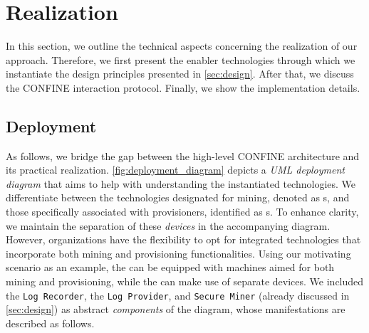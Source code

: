 \section{Realization}
\label{sec:realization}
In this section, we outline the technical aspects concerning the realization of our approach. Therefore, we first present the enabler technologies through which we instantiate the design principles presented in \cref{sec:design}. After that, we discuss the CONFINE interaction protocol. Finally, we show the implementation details.

\subsection{Deployment}
As follows, we bridge the gap between the high-level CONFINE architecture and its practical realization. \cref{fig:deployment_diagram} depicts a \textit{UML deployment diagram} \cite{koch2002expressive} that aims to help with understanding the instantiated technologies. We differentiate between the technologies designated for mining, denoted as s, and those specifically associated with provisioners, identified as s. To enhance clarity, we maintain the separation of these \textit{devices} in the accompanying diagram. However, organizations have the flexibility to opt for integrated technologies that incorporate both mining and provisioning functionalities. Using our motivating scenario as an example, the  can be equipped with machines aimed for both mining and provisioning, while the  can make use of separate devices. We included the \texttt{Log Recorder}, the \texttt{Log Provider}, and \texttt{Secure Miner} (already discussed in \cref{sec:design}) as abstract \textit{components} of the diagram, whose manifestations are described as follows. 

